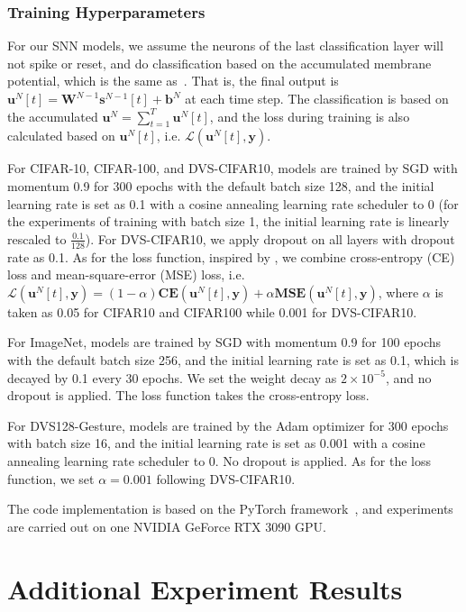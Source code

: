 \documentclass{article}
\begin{document}
\subsubsection{Training Hyperparameters}

For our SNN models, we assume the neurons of the last classification layer will not spike or reset, and do classification based on the accumulated membrane potential, which is the same as~\cite{xiao2021training}. That is, the final output is $\mathbf{u}^N[t]=\mathbf{W}^{N-1}\mathbf{s}^{N-1}[t]+\mathbf{b}^N$ at each time step. The classification is based on the accumulated $\mathbf{u}^N=\sum_{t=1}^T\mathbf{u}^N[t]$, and the loss during training is also calculated based on $\mathbf{u}^N[t]$, i.e. $\mathcal{L}(\mathbf{u}^N[t], \mathbf{y})$.

For CIFAR-10, CIFAR-100, and DVS-CIFAR10, models are trained by SGD with momentum 0.9 for 300 epochs with the default batch size 128, and the initial learning rate is set as 0.1 with a cosine annealing learning rate scheduler to 0 (for the experiments of training with batch size 1, the initial learning rate is linearly rescaled to $\frac{0.1}{128}$). For DVS-CIFAR10, we apply dropout on all layers with dropout rate as 0.1. As for the loss function, inspired by \cite{deng2021temporal}, we combine cross-entropy (CE) loss and mean-square-error (MSE) loss, i.e. $\mathcal{L}(\mathbf{u}^N[t], \mathbf{y})=(1-\alpha)\textbf{CE}(\mathbf{u}^N[t], \mathbf{y})+\alpha\textbf{MSE}(\mathbf{u}^N[t], \mathbf{y})$, where $\alpha$ is taken as 0.05 for CIFAR10 and CIFAR100 while 0.001 for DVS-CIFAR10.

For ImageNet, models are trained by SGD with momentum 0.9 for 100 epochs with the default batch size 256, and the initial learning rate is set as 0.1, which is decayed by 0.1 every 30 epochs. We set the weight decay as $2\times 10^{-5}$, and no dropout is applied. The loss function takes the cross-entropy loss.

For DVS128-Gesture, models are trained by the Adam optimizer for 300 epochs with batch size 16, and the initial learning rate is set as 0.001 with a cosine annealing learning rate scheduler to 0. No dropout is applied. As for the loss function, we set $\alpha=0.001$ following DVS-CIFAR10.

The code implementation is based on the PyTorch framework~\cite{paszke2019pytorch}, and experiments are carried out on one NVIDIA GeForce RTX 3090 GPU.

\section{Additional Experiment Results}
\end{document}
